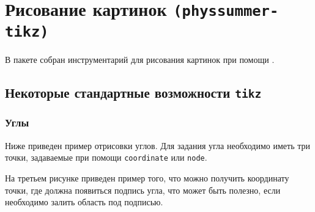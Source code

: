 \section{Рисование картинок \texttt{(physsummer-tikz)}}

В пакете собран инструментарий для рисования картинок при помощи \tikzt.



\subsection{Некоторые стандартные возможности \texttt{tikz}}

\subsubsection{Углы}

Ниже приведен пример отрисовки углов. Для задания угла необходимо иметь три точки, задаваемые при помощи
\texttt{coordinate} или \texttt{node}.

На третьем рисунке приведен пример того, что можно получить координату точки, где должна появиться
подпись угла, что может быть полезно, если необходимо залить область под подписью.

